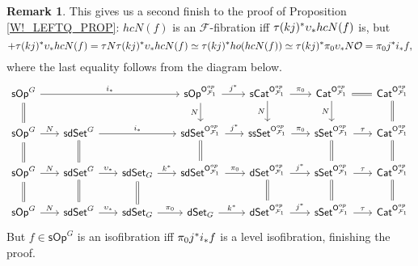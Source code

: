 \documentclass[a4paper,10pt
,draft
]{article}%
\numberwithin{equation}{section}
\numberwithin{figure}{section}
\theoremstyle{definition} %
\newtheorem{remark}[equation]{Remark}%
\newcommand{\sSet}{\ensuremath{\mathsf{sSet}}}%
\newcommand{\Cat}{\mathsf{Cat}}
\newcommand{\sOp}{\ensuremath{\mathsf{sOp}}}%
\newcommand{\dSet}{\mathsf{dSet}}
\newcommand{\F}{\ensuremath{\mathcal F}}
\renewcommand{\O}{\ensuremath{\mathcal O}}
\newcommand{\1}{\ensuremath{\mathbbm 1}}%
\begin{document}
\begin{remark}
      \label{W!_LEFTQ_REM}
      This gives us a second finish to the proof of Proposition \ref{W!_LEFTQ_PROP}:
      $hcN(f)$ is an $\F$-fibration iff $\tau (kj)^{\**} \upsilon_{\**} h c N(f)$ is,
      but
      \[
            +            \tau (kj)^{\**} \upsilon_{\**} hcN(f) =
            \tau N \tau (kj)^{\**} \upsilon_{\**} hcN(f) \simeq
            \tau (kj)^{\**} ho( hcN(f) ) \simeq
            \tau (kj)^{\**} \pi_0 \upsilon_{\**} N \O =
            \pi_0 j^{\**} i_{\**} f,
      \]
      where the last equality follows from the diagram below.
      \[
            \begin{tikzcd}[column sep = scriptsize]
                  \sOp^G \arrow[d, equal] \arrow[rrr, "i_{\**}"]
                  &&&
                  \sOp^{\mathsf O_{\F_1}^{op}} \arrow[d, "N"'] \arrow[r, "j^{\**}"]
                  &
                  \mathsf{sCat}^{\mathsf O_{\F_1}^{op}} \arrow[d, "N"'] \arrow[r, "\pi_0"]
                  &
                  \Cat^{\mathsf O_{\F_1}^{op}} \arrow[d, "N"'] \arrow[r, equal]
                  &
                  \Cat^{\mathsf O_{\F_1}^{op}} \arrow[d, equal]
                  \\
                  \sOp^G \arrow[d, equal] \arrow[r, "N"]
                  &
                  \mathsf{sdSet}^G \arrow[d, equal] \arrow[rr, "i_{\**}"]
                  &&
                  \mathsf{sdSet}^{\mathsf O_{\F_1}^{op}} \arrow[d, equal] \arrow[r, "j^{\**}"]
                  &
                  \mathsf{ssSet}^{\mathsf O_{\F_1}^{op}} \arrow[r, "\pi_0"]
                  &
                  \sSet^{\mathsf O_{\F_1}^{op}} \arrow[d, equal] \arrow[r, "\tau"]
                  &
                  \Cat^{\mathsf O_{\F_1}^{op}} \arrow[d, equal]
                  \\
                  \sOp^G \arrow[d, equal] \arrow[r, "N"]
                  &
                  \mathsf{sdSet}^G \arrow[d, equal] \arrow[r, "\upsilon_{\**}"]
                  &
                  \mathsf{sdSet}_G \arrow[d, equal] \arrow[r, "k^{\**}"]
                  &
                  \mathsf{sdSet}^{\mathsf O_{\F_1}^{op}} \arrow[r, "\pi_0"]
                  &
                  \dSet^{\mathsf O_{\F_1}^{op}} \arrow[d, equal] \arrow[r, "j^{\**}"]
                  &
                  \sSet^{\mathsf O_{\F_1}^{op}} \arrow[d, equal] \arrow[r, "\tau"]
                  &
                  \Cat^{\mathsf O_{\F_1}^{op}} \arrow[d, equal]
                  \\
                  \sOp^G \arrow[r, "N"]
                  &
                  \mathsf{sdSet}^G \arrow[r, "\upsilon_{\**}"]
                  &
                  \mathsf{sdSet}_G \arrow[r, "\pi_0"]
                  &
                  \dSet_G \arrow[r, "k^{\**}"]
                  &
                  \dSet^{\mathsf O_{\F_1}^{op}} \arrow [r, "j^{\**}"]
                  &
                  \sSet^{\mathsf O_{\F_1}^{op}} \arrow[r, "\tau"]
                  &
                  \Cat^{\mathsf O_{\F_1}^{op}}
            \end{tikzcd}
      \]
      But $f \in \sOp^G$ is an isofibration iff
      $\pi_0 j^{\**} i_{\**} f$ is a level isofibration, finishing the proof.
\end{remark}
\end{document}
